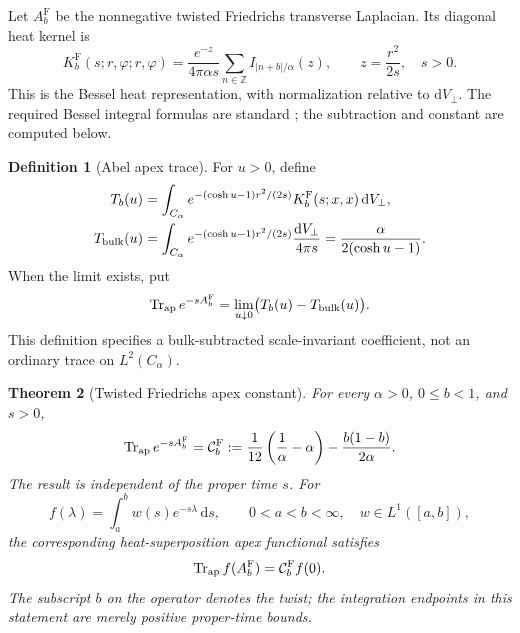 \documentclass[11pt,a4paper]{article}
\newcommand{\ZZ}{\mathbb Z}
\newcommand{\dd}{\mathrm d}
\newcommand{\Fr}{\mathrm F}
\newcommand{\Ccb}{\mathcal C}
\newcommand{\abs}[1]{\lvert #1\rvert}
\newcommand{\ApTr}{\operatorname{Tr}_{\rm ap}}
\theoremstyle{plain}
\newtheorem{theorem}{Theorem}[section]
\theoremstyle{definition}
\newtheorem{definition}[theorem]{Definition}
\theoremstyle{remark}
\numberwithin{equation}{section}
\begin{document}
Let \(A_b^\Fr\) be the nonnegative twisted Friedrichs transverse
Laplacian. Its diagonal heat kernel is
\begin{equation}
K_b^\Fr(s;r,\varphi;r,\varphi)
 =
\frac{e^{-z}}{4\pi\alpha s}
 \sum_{n\in\ZZ} I_{\abs{n+b}/\alpha}(z),
\qquad
z=\frac{r^2}{2s},
\quad s>0.
\label{eq:heatkernel}
\end{equation}
This is the Bessel heat representation, with normalization relative
to \(\dd V_\perp\).
The required Bessel integral formulas are standard
\cite{DLMF,DerezinskiRichard}; the subtraction and constant are
computed below.

\begin{definition}[Abel apex trace]
\label{def:apex}
For \(u>0\), define
\begin{align}
T_b(u)
 &=\int_{C_\alpha}
 e^{-(\cosh u-1)r^2/(2s)}
 K_b^\Fr(s;x,x)\,\dd V_\perp,\nonumber\\
T_{\rm bulk}(u)
 &=\int_{C_\alpha}
 e^{-(\cosh u-1)r^2/(2s)}
 \frac{\dd V_\perp}{4\pi s}
 =\frac{\alpha}{2(\cosh u-1)}.
\label{eq:Abeltrace}
\end{align}
When the limit exists, put
\[
\ApTr e^{-sA_b^\Fr}
 =\lim_{u\downarrow0}\bigl(T_b(u)-T_{\rm bulk}(u)\bigr).
\]
This definition specifies a bulk-subtracted scale-invariant
coefficient, not an ordinary trace on \(L^2(C_\alpha)\).
\end{definition}

\begin{theorem}[Twisted Friedrichs apex constant]
\label{thm:apex}
For every \(\alpha>0\), \(0\le b<1\), and \(s>0\),
\begin{equation}
\ApTr e^{-sA_b^\Fr}
 =\Ccb_b^\Fr
 :=\frac1{12}\left(\frac1\alpha-\alpha\right)
   -\frac{b(1-b)}{2\alpha}.
\label{eq:Cb}
\end{equation}
The result is independent of the proper time \(s\).
For
\[
f(\lambda)=\int_a^b w(s)e^{-s\lambda}\,\dd s,
\qquad 0<a<b<\infty,\quad w\in L^1([a,b]),
\]
the corresponding heat-superposition apex functional satisfies
\begin{equation}
\ApTr f(A_b^\Fr)=\Ccb_b^\Fr f(0).
\label{eq:functional}
\end{equation}
The subscript \(b\) on the operator denotes the twist;
the integration endpoints in this statement are merely positive
proper-time bounds.
\end{theorem}
\end{document}
